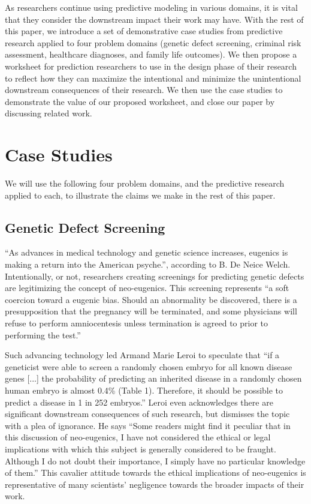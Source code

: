 \documentclass[12pt]{article}
\begin{document}
As researchers continue using predictive modeling in various domains, it is vital that they consider the downstream impact their work may have. With the rest of this paper, we introduce a set of demonstrative case studies from predictive research applied to four problem domains (genetic defect screening, criminal risk assessment, healthcare diagnoses, and family life outcomes). We then propose a worksheet for prediction researchers to use in the design phase of their research to reflect how they can maximize the intentional and minimize the unintentional downstream consequences of their research. We then use the case studies to demonstrate the value of our proposed worksheet, and close our paper by discussing related work. 

\section{Case Studies}
    
    We will use the following four problem domains, and the predictive research applied to each, to illustrate the claims we make in the rest of this paper. 

    \subsection{Genetic Defect Screening}
    
        ``As advances in medical technology and genetic science increases, eugenics is making a return into the American psyche.'', according to B. De Neice Welch. Intentionally, or not, researchers creating screenings for predicting genetic defects are legitimizing the concept of neo-eugenics. This screening represents ``a soft coercion toward a eugenic bias. Should an abnormality be discovered, there is a presupposition that the pregnancy will be terminated, and some physicians will refuse to perform amniocentesis unless termination is agreed to prior to performing the test.'' \cite{welchPhD} 

        Such advancing technology led Armand Marie Leroi to speculate that ``if a geneticist were able to screen a randomly chosen embryo for all known disease genes [...]  the probability of predicting an inherited disease in a randomly chosen human embryo is almost 0.4\% (Table 1). Therefore, it should be possible to predict a disease in 1 in 252 embryos.''\cite{neoeugenics} Leroi even acknowledges there are significant downstream consequences of such research, but dismisses the topic with a plea of ignorance. He says ``Some readers might find it peculiar that in this discussion of neo-eugenics, I have not considered the ethical or legal implications with which this subject is generally considered to be fraught. Although I do not doubt their importance, I simply have no particular knowledge of them.'' This cavalier attitude towards the ethical implications of neo-eugenics is representative of many scientists' negligence towards the broader impacts of their work. 
\end{document}
